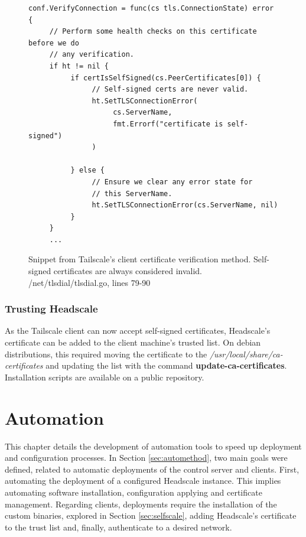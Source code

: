 \documentclass[11pt,twoside,a4paper]{report}
\begin{document}
\begin{figure}
\centering
\begin{lstlisting}
conf.VerifyConnection = func(cs tls.ConnectionState) error {
     // Perform some health checks on this certificate before we do
     // any verification.
     if ht != nil {
          if certIsSelfSigned(cs.PeerCertificates[0]) {
               // Self-signed certs are never valid.
               ht.SetTLSConnectionError(
                    cs.ServerName,
                    fmt.Errorf("certificate is self-signed")
               )

          } else {
               // Ensure we clear any error state for
               // this ServerName.
               ht.SetTLSConnectionError(cs.ServerName, nil)
          }
     }
     ...
\end{lstlisting}
\label{fig:tscert}
\caption{Snippet from Tailscale's client certificate verification method. Self-signed certificates are always considered invalid. /net/tlsdial/tlsdial.go, lines 79-90 }
\end{figure}

\subsection{Trusting Headscale}

As the Tailscale client can now accept self-signed certificates, Headscale's certificate can be added to the client machine's trusted list. On debian distributions, this required moving the certificate to the \emph{/usr/local/share/ca-certificates} and updating the list with the command \textbf{update-ca-certificates}. Installation scripts are available on a public repository.

\chapter{Automation}

This chapter details the development of automation tools to speed up deployment and configuration processes. In Section \ref{sec:automethod}, two main goals were defined, related to automatic deployments of the control server and clients. First, automating the deployment of a configured Headscale instance. This implies automating software installation, configuration applying and certificate management. Regarding clients, deployments require the installation of the custom binaries, explored in Section \ref{sec:selfscale}, adding Headscale's certificate to the trust list and, finally, authenticate to a desired network.
\end{document}
